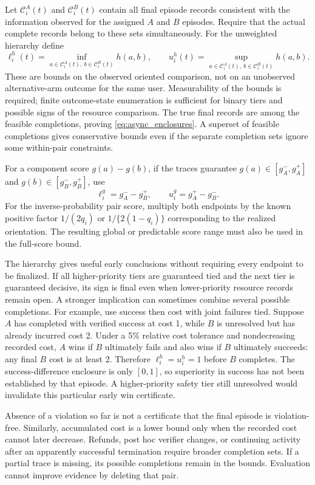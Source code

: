 Let $\mathcal C_i^A(t)$ and $\mathcal C_i^B(t)$ contain all final
episode records consistent with the information observed for the assigned
$A$ and $B$ episodes. Require that the actual complete records belong
to these sets simultaneously. For the unweighted hierarchy define
\begin{equation}
 \ell_i^h(t)=\inf_{a\in\mathcal C_i^A(t),\ b\in\mathcal C_i^B(t)}h(a,b),
 \qquad
 u_i^h(t)=\sup_{a\in\mathcal C_i^A(t),\ b\in\mathcal C_i^B(t)}h(a,b).
 \label{eq:async_kernel_set}
\end{equation}
These are bounds on the observed oriented comparison, not on an
unobserved alternative-arm outcome for the same user. Measurability of
the bounds is required; finite outcome-state enumeration is sufficient
for binary tiers and possible signs of the resource comparison. The
true final records are among the feasible completions, proving
\eqref{eq:async_enclosures}. A superset of feasible completions gives
conservative bounds even if the separate completion sets ignore some
within-pair constraints.

For a component score $g(a)-g(b)$, if the traces guarantee
$g(a)\in[g_A^-,g_A^+]$ and $g(b)\in[g_B^-,g_B^+]$, use
\[
 \ell_i^g=g_A^- -g_B^+,\qquad
 u_i^g=g_A^+ -g_B^-.
\]
For the inverse-probability pair score, multiply both endpoints by the
known positive factor $1/(2q_i)$ or $1/\{2(1-q_i)\}$ corresponding to
the realized orientation. The resulting global or predictable score
range must also be used in the full-score bound.

The hierarchy gives useful early conclusions without requiring every
endpoint to be finalized. If all higher-priority tiers are guaranteed
tied and the next tier is guaranteed decisive, its sign is final even
when lower-priority resource records remain open. A stronger implication
can sometimes combine several possible completions. For example, use
success then cost with joint failures tied. Suppose $A$ has completed
with verified success at cost 1, while $B$ is unresolved but has already
incurred cost 2. Under a 5\% relative cost tolerance and nondecreasing
recorded cost, $A$ wins if $B$ ultimately fails and also wins if $B$
ultimately succeeds: any final $B$ cost is at least 2. Therefore
$\ell_i^h=u_i^h=1$ before $B$ completes. The success-difference enclosure
is only $[0,1]$, so superiority in success has not been established by
that episode. A higher-priority safety tier still unresolved would
invalidate this particular early win certificate.

Absence of a violation so far is not a certificate that the final
episode is violation-free. Similarly, accumulated cost is a lower bound
only when the recorded cost cannot later decrease. Refunds, post hoc
verifier changes, or continuing activity after an apparently successful
termination require broader completion sets. If a partial trace is
missing, its possible completions remain in the bounds. Evaluation
cannot improve evidence by deleting that pair.

